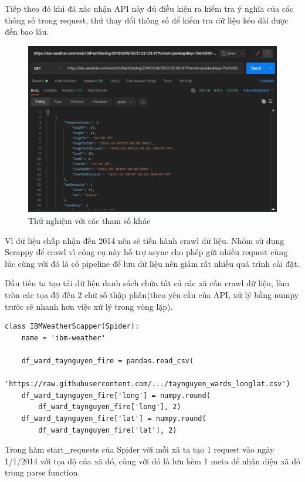 \documentclass{article}
\begin{document}
Tiếp theo đó khi đã xác nhận API này đủ điều kiện ra kiểm tra ý nghĩa của các thông số trong request, thử thay đổi thông số để kiểm tra dữ liệu kéo dài được đến bao lâu.


\begin{figure}[H]
	\centering
	\includegraphics[width=6in]{images/checkpast.png}
	\caption{Thử nghiệm với các tham số khác}
\end{figure}

Vì dữ liệu chấp nhận đến 2014 nên sẽ tiến hành crawl dữ liệu. Nhóm sử dụng Scrappy để crawl vì công cụ này hỗ trợ async cho phép gửi nhiều request cùng lúc cùng với đó là có pipeline để lưu dữ liệu nên giảm rất nhiều quá trình cài đặt.

Đầu tiên ta tạo tải dữ liệu danh sách chứa tất cả các xã cần crawl dữ liệu, làm tròn các tọa độ đến 2 chữ số thập phân(theo yêu cầu của API, xử lý bằng numpy trước sẽ nhanh hơn việc xử lý trong vòng lặp).

\begin{verbatim}
class IBMWeatherScapper(Spider):
    name = 'ibm-weather'

    df_ward_taynguyen_fire = pandas.read_csv(
        'https://raw.githubusercontent.com/.../taynguyen_wards_longlat.csv')
    df_ward_taynguyen_fire['long'] = numpy.round(
        df_ward_taynguyen_fire['long'], 2)
    df_ward_taynguyen_fire['lat'] = numpy.round(
        df_ward_taynguyen_fire['lat'], 2)
\end{verbatim}

Trong hàm start\_requests của Spider với mỗi xã ta tạo 1 request vào ngày 1/1/2014 với tọa độ của xã đó, cùng với đó là lưu kèm 1 meta để nhận diện xã đó trong parse function.
\end{document}
